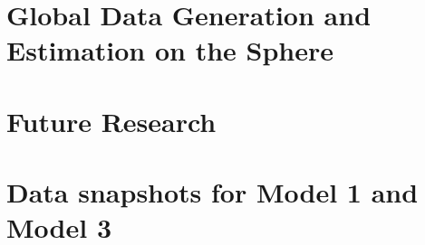 \documentclass[phd]{uncgdissertation}
\begin{document}
\chapter{Global Data Generation and Estimation on the Sphere}


\chapter{Future Research}






\appendix
\chapter{Data snapshots for Model 1 and Model 3}  \label{appendixA}


\backmatter %
\end{document}
